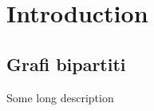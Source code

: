 \documentclass[../template]{subfiles}
\begin{document}
\section{Introduction}
\subsection{Grafi bipartiti}

Some long description
\end{document}
